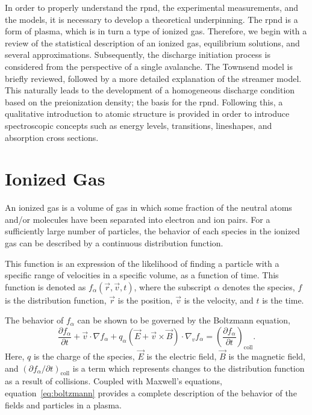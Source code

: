 In order to properly understand the \acs{rpnd}, the experimental measurements,
and the models, it is necessary to develop a theoretical underpinning. The
\acs{rpnd} is a form of plasma, which is in turn a type of ionized gas.
Therefore, we begin with a review of the statistical description of an ionized
gas, equilibrium solutions, and several approximations. Subsequently, the
discharge initiation process is considered from the perspective of a single
avalanche. The Townsend model is briefly reviewed, followed by a more detailed
explanation of the streamer model. This naturally leads to the development of a
homogeneous discharge condition based on the preionization density; the basis
for the \acs{rpnd}. Following this, a qualitative introduction to atomic
structure is provided in order to introduce spectroscopic concepts such as
energy levels, transitions, lineshapes, and absorption cross sections.

\section{Ionized Gas}
An ionized gas is a volume of gas in which some fraction of the neutral atoms
and/or molecules have been separated into electron and ion pairs. For a
sufficiently large number of particles, the behavior of each species in the
ionized gas can be described by a continuous distribution function.

This function is an expression of the likelihood of finding a particle with a
specific range of velocities in a specific volume, as a function of time. This
function is denoted as $f_\alpha(\vec{r}, \vec{v}, t)$, where the subscript
$\alpha$ denotes the species, $f$ is the distribution function, $\vec{r}$ is the
position, $\vec{v}$ is the velocity, and $t$ is the time.

The behavior of $f_\alpha$ can be shown \cite{Bellan2008} to be governed by the
Boltzmann equation,
\begin{equation}\label{eq:boltzmann}
  \frac{\partial f_\alpha}{\partial t} + \vec{v}\cdot\nabla f_\alpha +
  q_\alpha \left(\vec{E} + \vec{v}\times\vec{B}\right)
  \cdot \nabla_v f_\alpha = \left( \frac{\partial f_\alpha}
  {\partial t}\right)_\mathrm{coll}.
\end{equation}
Here, $q$ is the charge of the species, $\vec{E}$ is the electric field,
$\vec{B}$ is the magnetic field, and $(\partial f_\alpha/\partial
t)_\mathrm{coll}$ is a term which represents changes to the distribution
function as a result of collisions. Coupled with Maxwell's equations,
equation~\ref{eq:boltzmann} provides a complete description of the behavior of
the fields and particles in a plasma.

